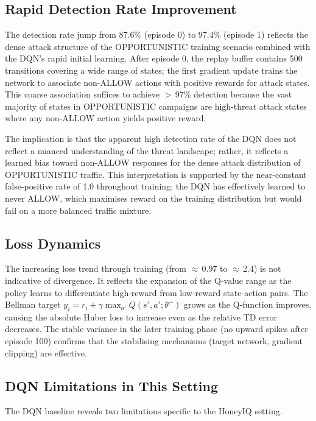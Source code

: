 \subsection{Rapid Detection Rate Improvement}

The detection rate jump from 87.6\% (episode 0) to 97.4\% (episode 1)
reflects the dense attack structure of the OPPORTUNISTIC training scenario
combined with the DQN's rapid initial learning.
After episode 0, the replay buffer contains 500 transitions covering a wide
range of states; the first gradient update trains the network to associate
non-ALLOW actions with positive rewards for attack states.
This coarse association suffices to achieve $>$\,97\% detection because the
vast majority of states in OPPORTUNISTIC campaigns are high-threat attack
states where any non-ALLOW action yields positive reward.

The implication is that the apparent high detection rate of the DQN does not
reflect a nuanced understanding of the threat landscape; rather, it reflects
a learned bias toward non-ALLOW responses for the dense attack distribution
of OPPORTUNISTIC traffic.
This interpretation is supported by the near-constant false-positive rate
of 1.0 throughout training: the DQN has effectively learned to never ALLOW,
which maximises reward on the training distribution but would fail on a more
balanced traffic mixture.

\subsection{Loss Dynamics}

The increasing loss trend through training (from $\approx$\,0.97 to
$\approx$\,2.4) is not indicative of divergence.
It reflects the expansion of the Q-value range as the policy learns to
differentiate high-reward from low-reward state-action pairs.
The Bellman target $y_i = r_i + \gamma \max_{a'} Q(s', a'; \theta^-)$
grows as the Q-function improves, causing the absolute Huber loss to
increase even as the relative TD error decreases.
The stable variance in the later training phase (no upward spikes after
episode 100) confirms that the stabilising mechanisms (target network,
gradient clipping) are effective.

\subsection{DQN Limitations in This Setting}

The DQN baseline reveals two limitations specific to the HoneyIQ setting.

